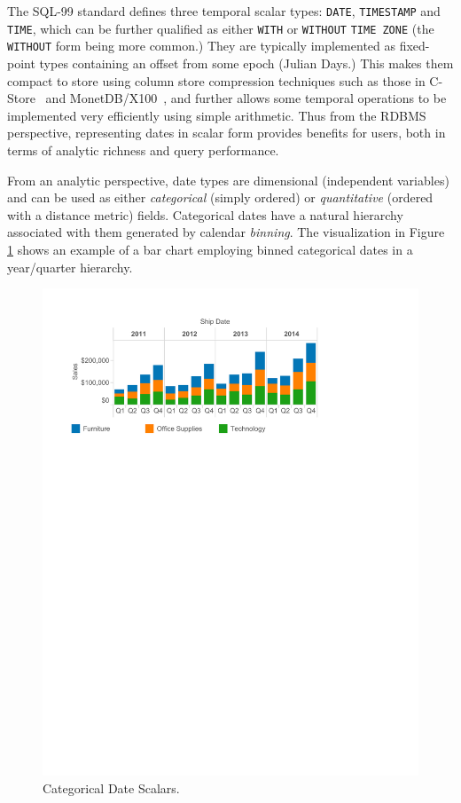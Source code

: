 The SQL-99 standard defines three temporal scalar types: \texttt{DATE}, \texttt{TIMESTAMP} and \texttt{TIME}, which can be further qualified as either \texttt{WITH} or \texttt{WITHOUT} \texttt{TIME ZONE} (the \texttt{WITHOUT} form being more common.) They are typically implemented as fixed-point types containing an offset from some epoch (\eg Julian Days.) This makes them compact to store using column store compression techniques such as those in C-Store~\cite{Stonebraker:2005} and MonetDB/X100~\cite{Zukowski:2006}, and further allows some temporal operations to be implemented very efficiently using simple arithmetic. Thus from the RDBMS perspective, representing dates in scalar form provides  benefits for users, both in terms of analytic richness and query performance.

From an analytic perspective, date types are dimensional (\ie independent variables) and can be used as either \textit{categorical} (simply ordered) or \textit{quantitative} (ordered with a distance metric) fields.
Categorical dates have a natural hierarchy associated with them generated by calendar \textit{binning}. The visualization in Figure \ref{fig:I1} shows an example of a bar chart employing binned categorical dates in a year/quarter hierarchy.

\begin{figure}[ht]
\centering
\includegraphics[width=\columnwidth]{figures/FigureI1}
\caption{Categorical Date Scalars.}
\label{fig:I1}
\end{figure}

